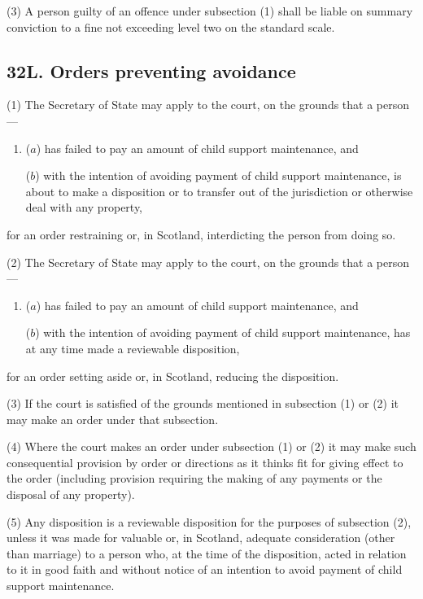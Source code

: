 \documentclass[a4paper]{article}
\begin{document}
(3)
A person guilty of an offence under subsection (1) shall be liable on summary conviction to a fine not exceeding level two on the standard scale.


\subsection{32L. Orders preventing avoidance}

(1) The Secretary of State may apply to the court, on the grounds that a person---
\begin{enumerate}\item[]
($a$) has failed to pay an amount of child support maintenance, and

($b$) with the intention of avoiding payment of child support maintenance, is about to make a disposition or to transfer out of the jurisdiction or otherwise deal with any property,
\end{enumerate}
for an order restraining or, in Scotland, interdicting the person from doing so.

(2) The Secretary of State may apply to the court, on the grounds that a person---
\begin{enumerate}\item[]
($a$) has failed to pay an amount of child support maintenance, and

($b$) with the intention of avoiding payment of child support maintenance, has at any time made a reviewable disposition,
\end{enumerate}
for an order setting aside or, in Scotland, reducing the disposition.

(3)
If the court is satisfied of the grounds mentioned in subsection (1) or (2) it may make an order under that subsection.

(4)
Where the court makes an order under subsection (1) or (2) it may make such consequential provision by order or directions as it thinks fit for giving effect to the order (including provision requiring the making of any payments or the disposal of any property).

(5)
Any disposition is a reviewable disposition for the purposes of subsection (2), unless it was made for valuable or, in Scotland, adequate consideration (other than marriage) to a person who, at the time of the disposition, acted in relation to it in good faith and without notice of an intention to avoid payment of child support maintenance.
\end{document}
